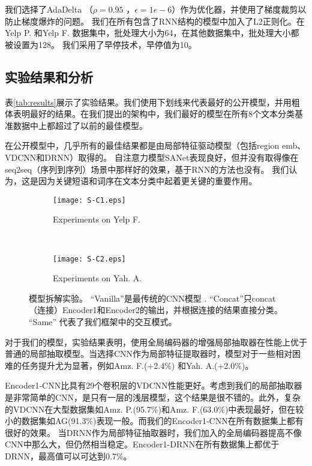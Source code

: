 我们选择了AdaDelta \cite{zeiler2012adadelta}（$\rho=0.95$ ，$\epsilon=1e-6$）作为优化器，并使用了梯度裁剪以防止梯度爆炸的问题。
我们在所有包含了RNN结构的模型中加入了L2正则化。在Yelp P. 和Yelp F. 数据集中，批处理大小为64，在其他数据集中，批处理大小都被设置为128。
我们采用了早停技术，早停值为10。


\subsection{实验结果和分析}
表\ref{tab:results}展示了实验结果。我们使用下划线来代表最好的公开模型，并用粗体表明最好的结果。在我们提出的架构中，我们最好的模型在所有8个文本分类基准数据中上都超过了以前的最佳模型。

在公开模型中，几乎所有的最佳结果都是由局部特征驱动模型（包括region emb、VDCNN和DRNN）取得的。
自注意力模型SANet表现良好，但并没有取得像在seq2seq（序列到序列）场景中那样好的效果，基于RNN的方法也没有。
我们认为，这是因为关键短语和词序在文本分类中起着更关键的重要作用。



\begin{figure*}[ht]
    \centering
    \begin{subfigure}[]{0.45\textwidth}
        \texttt{[image: S-C1.eps]}
        \caption{Experiments on Yelp F.}
        \label{fig:S1}
    \end{subfigure}
    ~
    \begin{subfigure}[]{0.45\textwidth}
        \texttt{[image: S-C2.eps]}
        \caption{Experiments on Yah. A.}
        \label{fig:S2}
    \end{subfigure}
    \caption{模型拆解实验。 ``Vanilla''是最传统的CNN模型 \citep{kim2014convolutional}. ``Concat''只concat（连接）Encoder1和Encoder2的输出，并根据连接的结果直接分类。 ``Same'' 代表了我们框架中的交互模式。}
    \label{fig: Ablation}
\end{figure*}

对于我们的模型，实验结果表明，使用全局编码器的增强局部抽取器在性能上优于普通的局部抽取模型。当选择CNN作为局部特征提取器时，模型对于一些相对困难的任务提升尤为显著，例如Amz. F.(+2.4\%) 和Yah. A.(+2.0\%)。

Encoder1-CNN比具有29个卷积层的VDCNN性能更好。考虑到我们的局部抽取器是非常简单的CNN，是只有一层的浅层模型，这个结果是很不错的。此外，复杂的VDCNN在大型数据集如Amz. P.(95.7\%)和Amz. F.(63.0\%)中表现最好，但在较小的数据集如AG(91.3\%)表现一般。而我们的Encoder1-CNN在所有数据集上都有很好的效果。
当DRNN作为局部特征抽取器时，我们加入的全局编码器提高不像CNN中那么大，但仍然相当稳定。Encoder1-DRNN在所有数据集上都优于DRNN，最高值可以可达到0.7\%。
